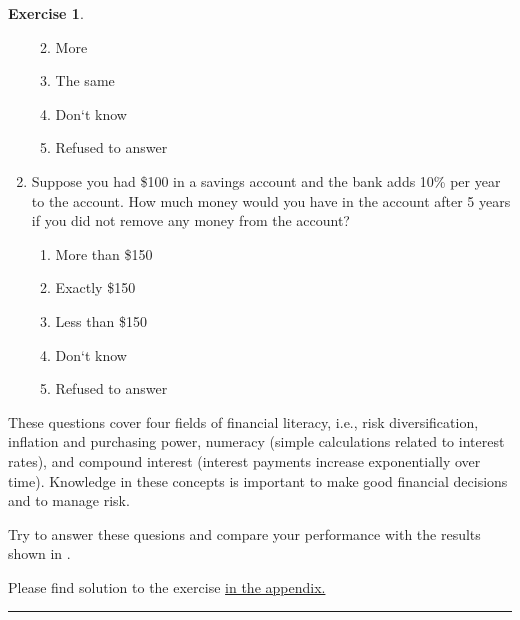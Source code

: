 \documentclass[
  12pt,
  oneside]{book}
\providecommand{\tightlist}{%
  \setlength{\itemsep}{0pt}\setlength{\parskip}{0pt}}
\theoremstyle{definition}
\theoremstyle{definition}
\theoremstyle{definition}
\newtheorem{exercise}{Exercise}[chapter]
\theoremstyle{definition}
\theoremstyle{remark}
\begin{document}
\begin{exercise}
\begin{enumerate}
  \begin{enumerate}
  \def\labelenumii{\alph{enumii})}
  \tightlist
  \item
    More
  \item
    The same
  \item
    Don`t know
  \item
    Refused to answer
  \end{enumerate}
\item
  Suppose you had \$100 in a savings account and the bank adds 10\% per year to the account. How much money would you have in the account after 5 years if you did not remove any money from the account?

  \begin{enumerate}
  \def\labelenumii{\alph{enumii})}
  \tightlist
  \item
    More than \$150
  \item
    Exactly \$150
  \item
    Less than \$150
  \item
    Don`t know
  \item
    Refused to answer
  \end{enumerate}
\end{enumerate}

These questions cover four fields of financial literacy, i.e., risk diversification, inflation and purchasing power, numeracy (simple calculations related to interest rates), and compound interest (interest payments increase exponentially over time). Knowledge in these concepts is important to make good financial decisions and to manage risk.

Try to answer these quesions and compare your performance with the results shown in \citet{Klapper2020Financial}.

Please find solution to the exercise \protect\hyperlink{sol:flmeasure}{in the appendix.}

\begin{center}\rule{0.5\linewidth}{0.5pt}\end{center}

\end{exercise}
\end{document}
